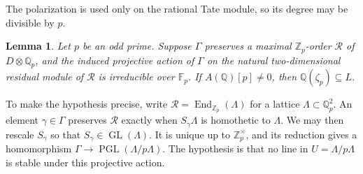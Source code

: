 \documentclass[11pt]{article}
\newtheorem{lemma}{Lemma}
\newcommand{\Q}{\mathbb Q}
\newcommand{\Z}{\mathbb Z}
\newcommand{\F}{\mathbb F}
\DeclareMathOperator{\End}{End}
\DeclareMathOperator{\GL}{GL}
\DeclareMathOperator{\PGL}{PGL}
\begin{document}
The polarization is used only on the rational Tate module, so its
degree may be divisible by \(p\).

\begin{lemma}\label{lem:cyclotomic}
Let \(p\) be an odd prime. Suppose \(\Gamma\) preserves a maximal
\(\Z_p\)-order \(\mathcal R\) of \(D\otimes\Q_p\), and the induced
projective action of \(\Gamma\) on the natural two-dimensional residual
module of \(\mathcal R\) is irreducible over \(\F_p\). If
\(A(\Q)[p]\neq0\), then \(\Q(\zeta_p)\subseteq L\).
\end{lemma}

To make the hypothesis precise, write
\(\mathcal R=\End_{\Z_p}(\Lambda)\) for a lattice
\(\Lambda\subset\Q_p^2\). An element \(\gamma\in\Gamma\) preserves
\(\mathcal R\) exactly when \(S_\gamma\Lambda\) is homothetic to
\(\Lambda\). We may then rescale \(S_\gamma\) so that
\(S_\gamma\in\GL(\Lambda)\). It is unique up to \(\Z_p^\times\), and
its reduction gives a homomorphism \(\Gamma\to\PGL(\Lambda/p\Lambda)\).
The hypothesis is that no line in \(U=\Lambda/p\Lambda\) is stable
under this projective action.
\end{document}
